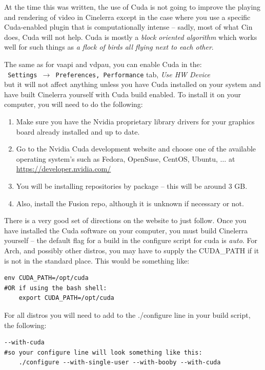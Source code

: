 At the time this was written, the use of Cuda is not going to improve the playing and rendering of video in Cinelerra except in the case where you use a specific Cuda-enabled plugin that is computationally intense -- sadly, most of what Cin does, Cuda will not help.  Cuda is mostly a \textit{block oriented algorithm} which works well for such things as \textit{a flock of birds all flying next to each other}.

The same as for vaapi and vdpau, you can enable Cuda in the:\\
\texttt{ Settings $\rightarrow$ Preferences, Performance} tab, \textit{Use HW Device}\\
but it will not affect anything unless you have Cuda installed on your system and have built Cinelerra yourself with Cuda build enabled.  To install it on your computer, you will need to do the following:

\begin{enumerate}
	\item Make sure you have the Nvidia proprietary library drivers for your graphics board already installed and up to date.
	\item Go to the Nvidia Cuda development website and choose one of the available operating system’s
	such as Fedora, OpenSuse, CentOS, Ubuntu, $\dots$ at   {\small \url{https://developer.nvidia.com/}}
	\item You will be installing repositories by package -- this will be around 3 GB.
	\item Also, install the Fusion repo, although it is unknown if necessary or not.
\end{enumerate}

There is a very good set of directions on the website to just follow.  Once you have installed the Cuda software on your computer, you must build Cinelerra yourself -- the default flag for a build in the configure script for cuda is \textit{auto}.  For Arch, and possibly other distros, you may have to supply the CUDA\_PATH if it is not in the standard place.  This would be
something like:


\begin{lstlisting}[numbers=none]
	env CUDA_PATH=/opt/cuda
#OR if using the bash shell: 
	export CUDA_PATH=/opt/cuda
\end{lstlisting}
For all distros you will need to add to the ./configure line in your build script, the following:


\begin{lstlisting}[numbers=none]
	--with-cuda
#so your configure line will look something like this:
	./configure --with-single-user --with-booby --with-cuda
\end{lstlisting}

